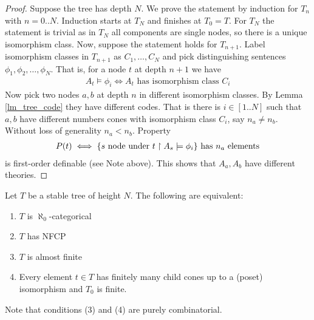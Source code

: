 \documentclass{amsart}
\begin{document}
\begin{proof}
	Suppose the tree has depth $N$. We prove the statement by induction for $T_n$ with $n = 0..N$. Induction starts at $T_N$ and finishes at $T_0 = T$. For $T_N$ the statement is trivial as in $T_N$ all components are single nodes, so there is a unique isomorphism class. Now, suppose the statement holds for $T_{n+1}$. Label isomorphism classes in $T_{n+1}$ as $C_1, \ldots, C_N$ and pick distinguishing sentences $\phi_1, \phi_2, \ldots, \phi_N$. That is, for a node $t$ at depth $n+1$ we have 
	\begin{align*}
		A_t \models \phi_i \iff A_t \text{ has isomorphism class } C_i
	\end{align*}
	Now pick two nodes $a,b$ at depth $n$ in different isomorphism classes. By Lemma \ref{lm_tree_code} they have different codes. That is there is $i \in [1..N]$ such that $a,b$ have different numbers cones with isomorphism class $C_i$, say $n_a \neq n_b$. Without loss of generality $n_a < n_b$. Property
	\begin{align*}
		P(t) \iff \{s \text{ node under $t$} \upharpoonright A_s \models \phi_i\} \text { has $n_a$ elements}
	\end{align*}
	is first-order definable (see Note above). This shows that $A_a, A_b$ have different theories. 
\end{proof}

\begin{Theorem} \label{th_tree_nfcp}
	Let $T$ be a stable tree of height $N$. The following are equivalent:
	\begin{enumerate}
		\item $T$ is $\aleph_0$-categorical
		\item $T$ has NFCP
		\item $T$ is almost finite
		\item Every element $t \in T$ has finitely many child cones up to a (poset) isomorphism and $T_0$ is finite.
	\end{enumerate}
\end{Theorem}

Note that conditions (3) and (4) are purely combinatorial.
\end{document}
